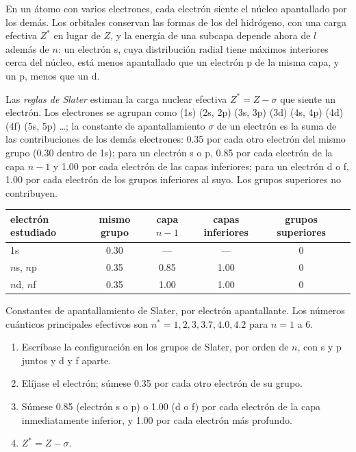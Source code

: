 En un átomo con varios electrones, cada electrón siente el núcleo apantallado por
los demás. Los orbitales conservan las formas de los del hidrógeno, con una carga
efectiva $Z^*$ en lugar de $Z$, y la energía de una subcapa depende ahora de $l$ además
de $n$: un electrón s, cuya distribución radial tiene máximos interiores cerca del
núcleo, está menos apantallado que un electrón p de la misma capa, y un p, menos
que un d.

\begin{definition}\label{def:b2:atomic-orbitals:slater}
Las \emph{reglas de Slater} estiman la carga nuclear efectiva
$Z^* = Z - \sigma$ que siente un electrón. Los electrones se agrupan como
(1s) (2s, 2p) (3s, 3p) (3d) (4s, 4p) (4d) (4f) (5s, 5p) \dots; la constante de
apantallamiento $\sigma$ de un electrón es la suma de las contribuciones de los demás
electrones: 0.35 por cada otro electrón del mismo grupo (0.30 dentro de 1s);
para un electrón s o p, 0.85 por cada electrón de la capa $n - 1$ y 1.00 por
cada electrón de las capas inferiores; para un electrón d o f, 1.00 por cada electrón
de los grupos inferiores al suyo. Los grupos superiores no contribuyen.
\end{definition}

\begin{omfigure}
\small
\renewcommand{\arraystretch}{1.2}
\begin{tabular}{l|ccccc}
electrón estudiado & mismo grupo & capa $n - 1$ & capas inferiores & grupos superiores \\ \hline
1s & 0.30 & --- & --- & 0 \\
$n$s, $n$p & 0.35 & 0.85 & 1.00 & 0 \\
$n$d, $n$f & 0.35 & 1.00 & 1.00 & 0 \\
\end{tabular}

\smallskip
{\small Constantes de apantallamiento de Slater, por electrón apantallante. Los números
cuánticos principales efectivos son $n^* = 1, 2, 3, 3.7, 4.0, 4.2$ para $n = 1$ a 6.}
\end{omfigure}

\begin{method}\label{met:b2:atomic-orbitals:slater}
\begin{enumerate}
  \item Escríbase la configuración en los grupos de Slater, por orden de $n$, con s y p
        juntos y d y f aparte.
  \item Elíjase el electrón; súmese 0.35 por cada otro electrón de su grupo.
  \item Súmese 0.85 (electrón s o p) o 1.00 (d o f) por cada electrón de la capa inmediatamente
        inferior, y 1.00 por cada electrón más profundo.
  \item $Z^* = Z - \sigma$.
\end{enumerate}
\end{method}

